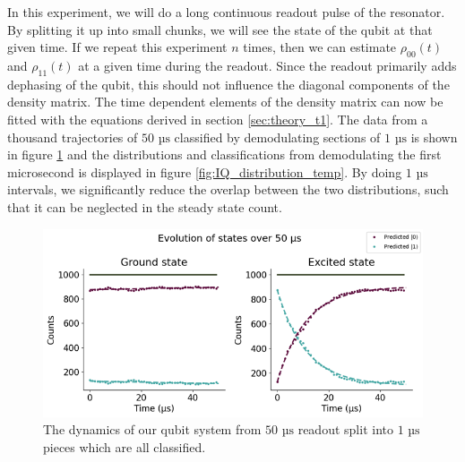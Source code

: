 In this experiment, we will do a long continuous readout pulse of the resonator. By splitting it up into small chunks, we will see the state of the qubit at that given time. If we repeat this experiment $n$ times, then we can estimate $\rho_{00}(t)$ and $\rho_{11}(t)$ at a given time during the readout. Since the readout primarily adds dephasing of the qubit, this should not influence the diagonal components of the density matrix. The time dependent elements of the density matrix can now be fitted with the equations derived in section \ref{sec:theory_t1}. The data from a thousand trajectories of $50 \text{ µs}$ classified by demodulating sections of $1 \text{ µs}$ is shown in figure \ref{fig:continous_calibration_decays} and the distributions and classifications from demodulating the first microsecond is displayed in figure \ref{fig:IQ_distribution_temp}. By doing $1 \text{ µs}$ intervals, we significantly reduce the overlap between the two distributions, such that it can be neglected in the steady state count.
\begin{figure}
    \centering
    \includegraphics{Figs/calibrations/contiuous/decays.png}
    \caption{The dynamics of our qubit system from $50 \text{ µs}$ readout split into $1 \text{ µs}$ pieces which are all classified.}
    \label{fig:continous_calibration_decays}
\end{figure}

